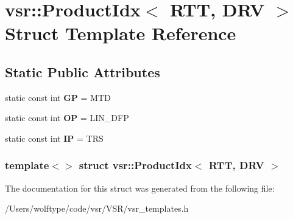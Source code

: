 \hypertarget{structvsr_1_1_product_idx_3_01_r_t_t_00_01_d_r_v_01_4}{\section{vsr\-:\-:Product\-Idx$<$ R\-T\-T, D\-R\-V $>$ Struct Template Reference}
\label{structvsr_1_1_product_idx_3_01_r_t_t_00_01_d_r_v_01_4}
}
\subsection*{Static Public Attributes}
\begin{DoxyCompactItemize}
\item 
\hypertarget{structvsr_1_1_product_idx_3_01_r_t_t_00_01_d_r_v_01_4_a39a7c58a69e9b8ec3147e14c95b94936}{static const int {\bfseries G\-P} = M\-T\-D}\label{structvsr_1_1_product_idx_3_01_r_t_t_00_01_d_r_v_01_4_a39a7c58a69e9b8ec3147e14c95b94936}

\item 
\hypertarget{structvsr_1_1_product_idx_3_01_r_t_t_00_01_d_r_v_01_4_ae60abe62a9b914128b9714475b26b35b}{static const int {\bfseries O\-P} = L\-I\-N\-\_\-\-D\-F\-P}\label{structvsr_1_1_product_idx_3_01_r_t_t_00_01_d_r_v_01_4_ae60abe62a9b914128b9714475b26b35b}

\item 
\hypertarget{structvsr_1_1_product_idx_3_01_r_t_t_00_01_d_r_v_01_4_ad61432ea0a223f497b655926e58a817f}{static const int {\bfseries I\-P} = T\-R\-S}\label{structvsr_1_1_product_idx_3_01_r_t_t_00_01_d_r_v_01_4_ad61432ea0a223f497b655926e58a817f}

\end{DoxyCompactItemize}
\subsubsection*{template$<$$>$ struct vsr\-::\-Product\-Idx$<$ R\-T\-T, D\-R\-V $>$}



The documentation for this struct was generated from the following file\-:\begin{DoxyCompactItemize}
\item 
/\-Users/wolftype/code/vsr/\-V\-S\-R/vsr\-\_\-templates.\-h\end{DoxyCompactItemize}
